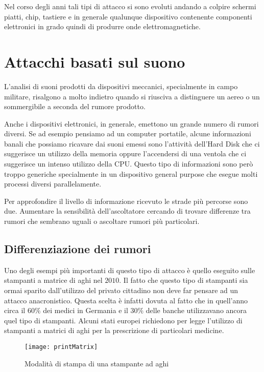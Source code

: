 		Nel corso degli anni tali tipi di attacco si sono evoluti andando a colpire schermi piatti\cite{kuhn2006eavesdropping}, chip\cite{martinasek2012simple}, tastiere\cite{vuagnoux2009compromising} e in generale qualunque dispositivo contenente componenti elettronici in grado quindi di produrre onde elettromagnetiche.
			
	\section{Attacchi basati sul suono}
		L'analisi di suoni prodotti da dispositivi meccanici, specialmente in campo militare, risalgono a molto indietro quando si riusciva a distinguere un aereo o un sommergibile a seconda del rumore prodotto.
	
		Anche i dispositivi elettronici, in generale, emettono un grande numero di rumori diversi. Se ad esempio pensiamo ad un computer portatile, alcune informazioni banali che possiamo ricavare dai suoni emessi sono l'attività dell'Hard Disk che ci suggerisce un utilizzo della memoria oppure l'accendersi di una ventola che ci suggerisce un intenso utilizzo della CPU. Questo tipo di informazioni sono però troppo generiche specialmente in un dispositivo general purpose che esegue molti processi diversi parallelamente.
	
		Per approfondire il livello di informazione ricevuto le strade più percorse sono due. Aumentare la sensibilità dell'ascoltatore cercando di trovare differenze tra rumori che sembrano uguali o ascoltare rumori più particolari.
	
		\subsection{Differenziazione dei rumori}	
			Uno degli esempi più importanti di questo tipo di attacco è quello eseguito sulle stampanti a matrice di aghi nel $2010$\cite{backes2010acoustic}. Il fatto che questo tipo di stampanti sia ormai sparito dall'utilizzo del privato cittadino non deve far pensare ad un attacco anacronistico. Questa scelta è infatti dovuta al fatto che in quell'anno circa il $60\%$ dei medici in Germania e il $30\%$ delle banche utilizzavano ancora quel tipo di stampanti. Alcuni stati europei richiedono per legge l'utilizzo di stampanti a matrici di aghi per la prescrizione di particolari medicine\cite{bernatzky2011schmerzbehandlung}.
			
			\begin{figure}
				\begin{center}
					\texttt{[image: printMatrix]}
					\caption{Modalità di stampa di una stampante ad aghi}
					\label{fig:matrixHead}
				\end{center}
			\end{figure}
			
